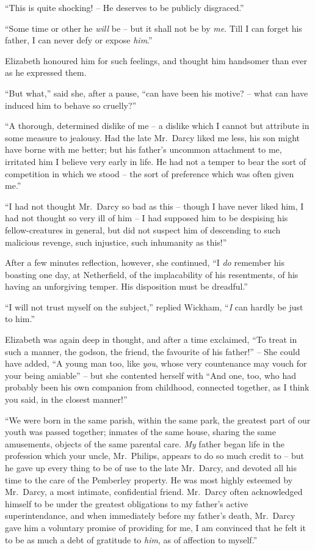 “This is quite shocking! -- He deserves to be publicly
disgraced.”

“Some time or other he \textit{will} be -- but it shall not be
by \textit{me}. Till I can forget his father, I can never defy or
expose \textit{him}.”

Elizabeth honoured him for such feelings, and thought
him handsomer than ever as he expressed them.

“But what,” said she, after a pause, “can have been
his motive? -- what can have induced him to behave so
cruelly?”

“A thorough, determined dislike of me -- a dislike which
I cannot but attribute in some measure to jealousy. Had
the late Mr.\ Darcy liked me less, his son might have borne
with me better; but his father’s uncommon attachment
to me, irritated him I believe very early in life. He had
not a temper to bear the sort of competition in which we
stood -- the sort of preference which was often given me.”

“I had not thought Mr.\ Darcy so bad as this -- though
I have never liked him, I had not thought so very ill of
him -- I had supposed him to be despising his fellow-creatures
in general, but did not suspect him of descending
to such malicious revenge, such injustice, such inhumanity
as this!”

After a few minutes reflection, however, she continued,
“I \textit{do} remember his boasting one day, at Netherfield, of
the implacability of his resentments, of his having an
unforgiving temper. His disposition must be dreadful.”

“I will not trust myself on the subject,” replied Wickham,
“\textit{I} can hardly be just to him.”

Elizabeth was again deep in thought, and after a time
exclaimed, “To treat in such a manner, the godson, the
friend, the favourite of his father!” -- She could have
added, “A young man too, like \textit{you}, whose very
countenance may vouch for your being amiable” -- but she
contented herself with “And one, too, who had probably
been his own companion from childhood, connected
together, as I think you said, in the closest manner!”

“We were born in the same parish, within the same
park, the greatest part of our youth was passed together;
inmates of the same house, sharing the same amusements,
objects of the same parental care. \textit{My} father began life
in the profession which your uncle, Mr.\ Philips, appears
to do so much credit to -- but he gave up every thing to
be of use to the late Mr.\ Darcy, and devoted all his time
to the care of the Pemberley property. He was most
highly esteemed by Mr.\ Darcy, a most intimate, confidential
friend. Mr.\ Darcy often acknowledged himself to
be under the greatest obligations to my father’s active
superintendance, and when immediately before my father’s
death, Mr.\ Darcy gave him a voluntary promise of providing
for me, I am convinced that he felt it to be as much
a debt of gratitude to \textit{him}, as of affection to myself.”

